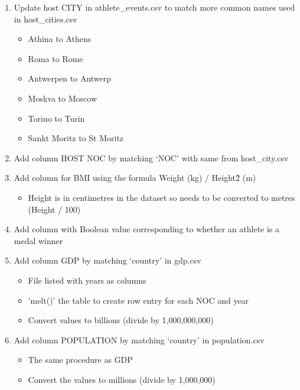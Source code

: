 \documentclass[a4 paper, 12pt]{article}
\begin{document}
\begin{enumerate}
            \item Update host CITY in athlete\_events.csv to match more common names used in host\_cities.csv
                \begin{itemize}
                    \item Athina to Athens
                    \item Roma to Rome 
                    \item Antwerpen to Antwerp
                    \item Moskva to Moscow
                    \item Torino to Turin
                    \item Sankt Moritz to St Moritz
                \end{itemize}                 
            \item Add column HOST NOC by matching ‘NOC’ with same from host\_city.csv
            \item Add column for BMI using the formula Weight (kg) / Height\^2 (m) 
               \begin{itemize}
                    \item Height is in centimetres in the dataset so needs to be converted to metres (Height / 100)
                \end{itemize}
            \item Add column with Boolean value corresponding to whether an athlete is a medal winner     
            \item Add column GDP by matching ‘country’ in gdp.csv
                \begin{itemize}
                    \item File listed with years as columns
                    \item 'melt()' the table to create row entry for each NOC and year
                    \item Convert values to billions (divide by 1,000,000,000)
                \end{itemize}
            \item Add column POPULATION by matching ‘country’ in population.csv  
                \begin{itemize}
                    \item The same procedure as GDP
                    \item Convert the values to millions (divide by 1,000,000)
                \end{itemize}
        \end{enumerate}
    
\end{document}
